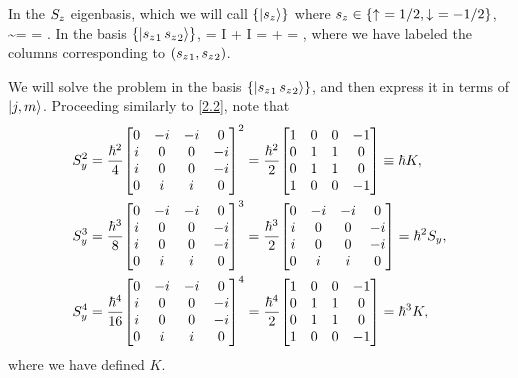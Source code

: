 \begin{solution}
	In the $S_z$ eigenbasis, which we will call $\{ \ket{s_z} \}$ where $s_z \in \{ \uparrow\ = 1/2, \downarrow\ = -1/2 \}$,
	\beq
		\Syq \sim \Syw =  \sigy =  \mqty[ 0 & -i \\ i & 0 ].
	\eeq
	In the basis $\{ \ket{{s_z}_1 \, {s_z}_2} \}$,
	\vspace{-.5\baselineskip}
	\beq
		\Sy = \Syw \otimes I + I \otimes \Syw
		=  \mqty[ 0 & 0 & -i & 0 \\ 0 & 0 & 0 & -i \\ i & 0 & 0 & 0 \\ 0 & i & 0 & 0 ] +  \mqty[ 0 & -i & 0 & 0 \\ i & 0 & 0 & 0 \\ 0 & 0 & 0 & -i \\ 0 & 0 & i & 0 ]
		=   \!\!\!\! ,
	\eeq
	where we have labeled the columns corresponding to $({s_z}_1, {s_z}_2)$.
	
	We will solve the problem in the basis $\{ \ket{{s_z}_1 \, {s_z}_2} \}$, and then express it in terms of $\ket{j, m}$.  Proceeding similarly to \ref{2.2}, note that
	\begin{align*}
		\Sy^2 &= \frac{\hbar^2}{4} \mqty[ 0 & -i & -i & 0 \\ i & 0 & 0 & -i \\ i & 0 & 0 & -i \\ 0 & i & i & 0 ]^2
		= \frac{\hbar^2}{2} \mqty[ 1 & 0 & 0 & -1 \\ 0 & 1 & 1 & 0 \\ 0 & 1 & 1 & 0 \\ 1 & 0 & 0 & -1 ]
		\equiv \hbar K, \\
		\Sy^3 &= \frac{\hbar^3}{8} \mqty[ 0 & -i & -i & 0 \\ i & 0 & 0 & -i \\ i & 0 & 0 & -i \\ 0 & i & i & 0 ]^3
		= \frac{\hbar^3}{2} \mqty[ 0 & -i & -i & 0 \\ i & 0 & 0 & -i \\ i & 0 & 0 & -i \\ 0 & i & i & 0 ]
		= \hbar^2 \Sy, \\
		\Sy^4 &= \frac{\hbar^4}{16} \mqty[ 0 & -i & -i & 0 \\ i & 0 & 0 & -i \\ i & 0 & 0 & -i \\ 0 & i & i & 0 ]^4
		= \frac{\hbar^4}{2} \mqty[ 1 & 0 & 0 & -1 \\ 0 & 1 & 1 & 0 \\ 0 & 1 & 1 & 0 \\ 1 & 0 & 0 & -1 ]
		= \hbar^3 K,
	\end{align*}
	where we have defined $K$.
	

\end{solution}
